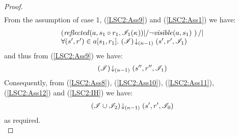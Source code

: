 \begin{lemma}
\begin{proof}
\begin{align}
\end{align}
%
From the assumption of case 1, (\ref{LSC2:Ass9}) and (\ref{LSC2:Ass1}) we have: 
%
\begin{align*}
	\begin{array}{@{} l @{}}
		\left(\m{reflected}(a, s_1 \composeL r_1, \lmod_1(\ca{})) |/ \neg\m{visible}(a, s_1) \ \right) /| \\
		\for{(s', r') \in a[s_1, r_1]} \extendsAMUpto{\lmod}{(n-1)}{s'}{r'}{\lmod_1}
	\end{array}
\end{align*}
and thus from (\ref{LSC2:Ass9}) we have:
%
%
\begin{align}
	\left(\mathscr{I}\right) \!\downarrow_{(n-1)} \left(s'', r'', \mathscr{I}_1\right)
	\label{LSC2:Ass12}
\end{align}
%
Consequently, from (\ref{LSC2:Ass8}), (\ref{LSC2:Ass10}), (\ref{LSC2:Ass11}), (\ref{LSC2:Ass12}) and (\ref{LSC2:IH}) we have: 
%
\begin{align*}
	\left(\mathscr{I} \cup \mathscr{I}_2\right) \!\downarrow_{(n-1)} \left(s', r', \mathscr{I}_0\right)
\end{align*}
%
as required.\\

%
%
%
%



\end{proof}
\end{lemma}
